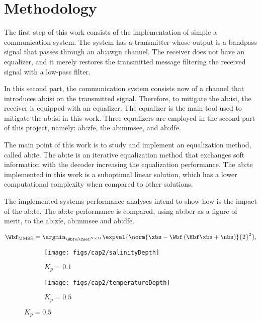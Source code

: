 \section{Methodology}

The first step of this work consists of the implementation of simple a communication system. The system has a transmitter whose output is a bandpass signal that passes through an \gls{ab:awgn} channel. The receiver does not have an equalizer, and it merely restores the transmitted message filtering the received signal with a low-pass filter.

In this second part, the communication system consists now of a channel that introduces \gls{ab:isi} on the transmitted signal. Therefore, to mitigate the \gls{ab:isi}, the receiver is equipped with an equalizer. The equalizer is the main tool used to mitigate the \gls{ab:isi} in this work. Three equalizers are employed in the second part of this project, namely: \gls{ab:zfe}, the \gls{ab:mmsee}, and \gls{ab:dfe}.

The main point of this work is to study and implement an equalization method, called \gls{ab:te}. The \gls{ab:te} is an iterative equalization method that exchanges soft information with the decoder increasing the equalization performance. The \gls{ab:te} implemented in this work is a suboptimal linear solution, which has a lower computational complexity when compared to other solutions. 

The implemented systems performance analyses intend to show how is the impact of the \gls{ab:te}. The \gls{ab:te} performance is compared, using \gls{ab:ber} as a figure of merit, to the \gls{ab:zfe}, \gls{ab:mmsee} and \gls{ab:dfe}.

\begin{equation}
\Wbf _ {\mathrm{MMSE}} = \argmin_{ \Wbf \in \Cset^{N \times M}} \expval{\norm{\xbs - \Wbf \left(\Hbf \xbs + \nbs \right) }{2}^{2}},
\end{equation}


\begin{figure}[!h]
	\centering
	\begin{subfigure}[b]{0.482\textwidth}
		\texttt{[image: figs/cap2/salinityDepth]}
		\caption{$K_{p} = 0.1$}
	\end{subfigure}
	\quad
	\begin{subfigure}[b]{0.482\textwidth}
		\texttt{[image: figs/cap2/temperatureDepth]}
		\caption{$K_{p} = 0.5$}
	\end{subfigure}
\end{figure}

